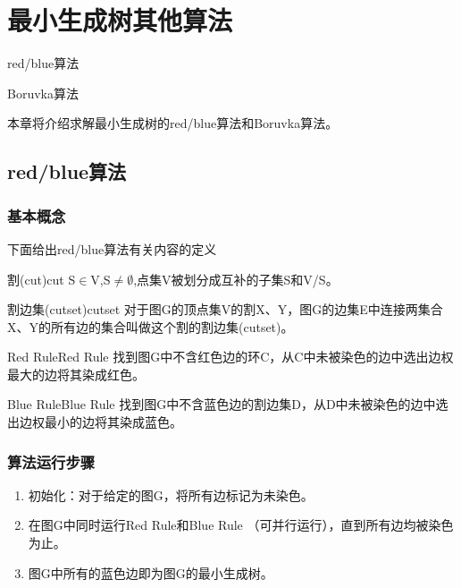 \chapter{最小生成树其他算法}

\begin{introduction}
	\item red/blue算法
	\item Boruvka算法
\end{introduction}

本章将介绍求解最小生成树的red/blue算法和Boruvka算法。

\section{red/blue算法}

\subsection{基本概念}
下面给出red/blue算法有关内容的定义
\begin{definition}{割(cut)}{cut}
	S$\in$V,S$\neq \emptyset$,点集V被划分成互补的子集S和V/S。
\end{definition}

\begin{definition}{割边集(cutset)}{cutset}
    对于图G的顶点集V的割X、Y，图G的边集E中连接两集合X、Y的所有边的集合叫做这个割的割边集(cutset)。
\end{definition}

\begin{definition}{Red Rule}{Red Rule}
    找到图G中不含红色边的环C，从C中未被染色的边中选出边权最大的边将其染成红色。
\end{definition}

\begin{definition}{Blue Rule}{Blue Rule}
    找到图G中不含蓝色边的割边集D，从D中未被染色的边中选出边权最小的边将其染成蓝色。
\end{definition}

\subsection{算法运行步骤}
\begin{enumerate}
	\item 初始化：对于给定的图G，将所有边标记为未染色。
	\item 在图G中同时运行Red Rule和Blue Rule （可并行运行），直到所有边均被染色为止。
	\item 图G中所有的蓝色边即为图G的最小生成树。
\end{enumerate}

